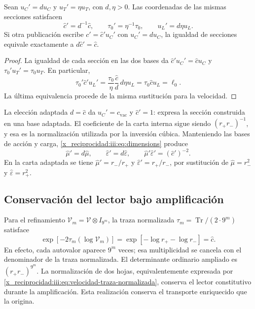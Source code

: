 \begin{proposition}
Sean $u_C'=d u_C$ y $u_T'=\eta u_T$, con $d,\eta>0$.
Las coordenadas de las mismas secciones satisfacen
\begin{equation}
 \widehat c'=d^{-1}\widehat c,
 \qquad \tau_0'=\eta^{-1}\tau_0,
 \qquad u_L'=d\eta u_L.
 \label{x_reciprocidad:iii:eq:velocidad-cambio-carta}
\end{equation}
Si otra publicación escribe $c'=\widehat c' u_C'$ con $u_C'=d u_C$,
la igualdad de secciones equivale exactamente a $d\widehat c'=\widehat c$.
\end{proposition}
\begin{proof}
La igualdad de cada sección en las dos bases da
$\widehat c'u_C'=\widehat c u_C$ y $\tau_0'u_T'=\tau_0u_T$.
En particular,
\[
 \tau_0'\widehat c'u_L'
 =\frac{\tau_0}{\eta}\frac{\widehat c}{d}\,d\eta u_L
 =\tau_0\widehat c u_L=\ell_0.
\]
La última equivalencia procede de la misma sustitución para la velocidad.
\end{proof}

La elección adaptada $d=\widehat c$ da $u_C'=c_{\mathrm{vac}}$ y
$\widehat c'=1$: expresa la sección construida en una base adaptada.
El coeficiente de la carta interna sigue siendo $(r_+r_-)^{-1}$, y esa
es la normalización utilizada por la inversión cúbica. Manteniendo las
bases de acción y carga, \eqref{x_reciprocidad:iii:eq:dimensions} produce
\[
 \widehat\mu'=d\widehat\mu,\qquad
 \widehat\varepsilon'=d\widehat\varepsilon,\qquad
 \widehat\mu'\widehat\varepsilon'=(\widehat c')^{-2}.
\]
En la carta adaptada se tiene $\widehat\mu'=r_-/r_+$ y
$\widehat\varepsilon'=r_+/r_-$, por sustitución de
$\widehat\mu=r_-^2$ y $\widehat\varepsilon=r_+^2$.

\subsection{Conservación del lector bajo amplificación}

Para el refinamiento $\mathcal V_m=\mathcal V\otimes I_{9^m}$, la
traza normalizada $\tau_m=\operatorname{Tr}/(2\cdot9^m)$ satisface
\begin{equation}
 \exp[-2\tau_m(\log\mathcal V_m)]
 =\exp[-\log r_+-\log r_-]=\widehat c.
 \label{x_reciprocidad:iii:eq:velocidad-traza-normalizada}
\end{equation}
En efecto, cada autovalor aparece $9^m$ veces; esa multiplicidad se
cancela con el denominador de la traza normalizada. El determinante
ordinario ampliado es $(r_+r_-)^{9^m}$. La normalización de dos hojas,
equivalentemente expresada por \eqref{x_reciprocidad:iii:eq:velocidad-traza-normalizada},
conserva el lector constitutivo durante la amplificación. Esta
realización conserva el transporte enriquecido que la origina.

